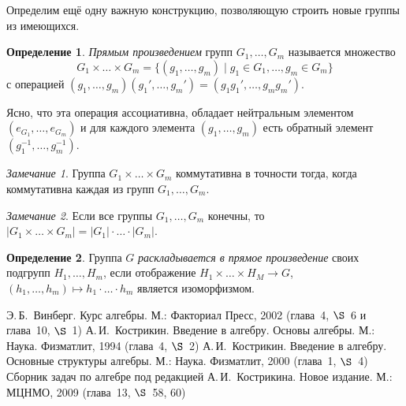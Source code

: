 \documentclass[a4paper,10pt]{amsart}
\theoremstyle{definition}
\newtheorem{definition}{Определение}
\theoremstyle{remark}
\newtheorem{remark}{Замечание}
\newtheorem{example}{Пример}
\begin{document}
Определим ещё одну важную конструкцию, позволяющую строить новые
группы из имеющихся.

\begin{definition}
{\it Прямым произведением} групп $G_1, \ldots, G_m$ называется
множество
$$
G_1\times\ldots\times G_m=\{(g_1,\ldots,g_m) \mid g_1\in G_1,\ldots,
g_m\in G_m\}
$$
с операцией
$(g_1,\ldots,g_m)(g_1',\ldots,g_m')=(g_1g_1',\ldots,g_mg_m')$.
\end{definition}

Ясно, что эта операция ассоциативна, обладает нейтральным элементом
$(e_{G_1},\ldots,e_{G_m})$ и для каждого элемента $(g_1,\ldots,g_m)$
есть обратный элемент $(g_1^{-1},\ldots,g_m^{-1})$.

\begin{remark}
Группа $G_1\times\ldots\times G_m$ коммутативна в точности тогда,
когда коммутативна каждая из групп $G_1,\ldots, G_m$.
\end{remark}

\begin{remark}
Если все группы $G_1, \ldots, G_m$ конечны, то $|G_1 \times \ldots
\times G_m| = |G_1| \cdot \ldots \cdot |G_m|$.
\end{remark}

\begin{definition}
Группа $G$ \textit{раскладывается в прямое произведение} своих подгрупп $H_1, \ldots, H_m$, если отображение $H_1 \times \ldots \times H_M \rightarrow G$, $(h_1, \ldots, h_m) \mapsto h_1 \cdot \ldots \cdot h_m$ является изоморфизмом.
\end{definition}



\bigskip

\begin{thebibliography}{99}
Э.\,Б.~Винберг. Курс алгебры. М.: Факториал Пресс, 2002 (глава~4,
$\S$~6 и глава~10, $\S$~1)
А.\,И.~Кострикин. Введение в алгебру. Основы алгебры. М.: Наука.
Физматлит, 1994 (глава~4, $\S$~2)
А.\,И.~Кострикин. Введение в алгебру. Основные структуры алгебры.
М.: Наука. Физматлит, 2000 (глава~1, $\S$~4)
Сборник задач по алгебре под редакцией А.\,И.~Кострикина. Новое
издание. М.: МЦНМО, 2009 (глава~13, $\S$~58, 60)
\end{thebibliography}
\end{document}
